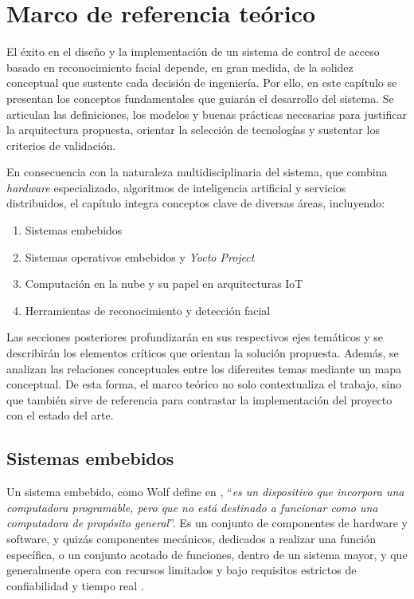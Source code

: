 \chapter{Marco  de referencia teórico}
\label{ch:marco}

El éxito en el diseño y la implementación de un sistema de control de acceso basado en reconocimiento facial depende, en gran medida, de la solidez conceptual que sustente cada decisión de ingeniería. Por ello, en este capítulo se presentan los conceptos fundamentales que guiarán el desarrollo del sistema. Se articulan las definiciones, los modelos y buenas prácticas necesarias para justificar la arquitectura propuesta, orientar la selección de tecnologías y sustentar los criterios de validación.

En consecuencia con la naturaleza multidisciplinaria del sistema, que combina \textit{hardware} especializado, algoritmos de inteligencia artificial y servicios distribuidos, el capítulo integra conceptos clave de diversas áreas, incluyendo:

\begin{enumerate}
    \item Sistemas embebidos
    \item Sistemas operativos embebidos y \textit{Yocto Project}
    \item Computación en la nube y su papel en arquitecturas IoT
    \item Herramientas de reconocimiento y detección facial
\end{enumerate}

Las secciones posteriores profundizarán en sus respectivos ejes temáticos y se describirán los elementos críticos que orientan la solución propuesta. Además, se analizan las relaciones conceptuales entre los diferentes temas mediante un mapa conceptual. De esta forma, el marco teórico no solo contextualiza el trabajo, sino que también sirve de referencia para contrastar la implementación del proyecto con el estado del arte.

\section{Sistemas embebidos}
Un sistema embebido, como Wolf define en \cite{wolf_embedded_2012}, ``\textit{es un dispositivo que incorpora una computadora programable, pero que no está destinado a funcionar como una computadora de propósito general}''. Es un conjunto de componentes de hardware y software, y quizás componentes mecánicos, dedicados a realizar una función específica, o un conjunto acotado de funciones, dentro de un sistema mayor, y que generalmente opera con recursos limitados y bajo requisitos estrictos de confiabilidad y tiempo real \cite{barr_embedded_1999}.

